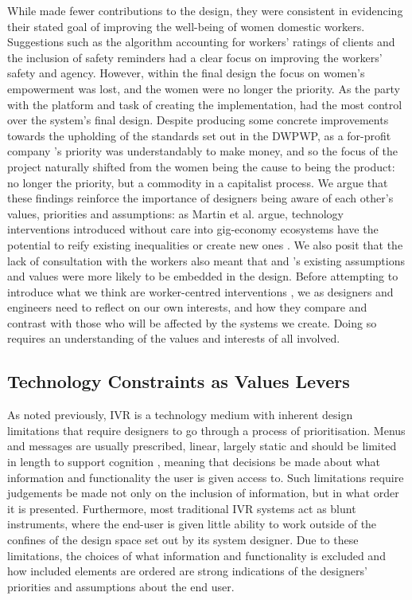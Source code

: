 While \NGO{} made fewer contributions to the design, they were consistent in evidencing their stated goal of improving the well-being of women domestic workers. Suggestions such as the algorithm accounting for workers' ratings of clients and the inclusion of safety reminders had a clear focus on improving the workers' safety and agency. However, within the final design the focus on women's empowerment was lost, and the women were no longer the priority. As the party with the platform and task of creating the implementation, \PC{} had the most control over the system's final design. Despite producing some concrete improvements towards the upholding of the standards set out in the DWPWP, as a for-profit company \PC{}'s priority was understandably to make money, and so the focus of the project naturally shifted from the women being the cause to being the product: no longer the priority, but a commodity in a capitalist process. We argue that these findings reinforce the importance of designers being aware of each other's values, priorities and assumptions: as Martin et al. argue, technology interventions introduced without care into gig-economy ecosystems have the potential to reify existing inequalities or create new ones \cite{martin2016}. We also posit that the lack of consultation with the workers also meant that \PC{} and \NGO{}'s existing assumptions and values were more likely to be embedded in the design. Before attempting to introduce what we think are worker-centred interventions \cite{carlos2021}, we as designers and engineers need to reflect on our own interests, and how they compare and contrast with those who will be affected by the systems we create. Doing so requires an understanding of the values and interests of all involved.


\subsection{Technology Constraints as Values Levers}

As noted previously, IVR is a technology medium with inherent design limitations that require designers to go through a process of prioritisation. Menus and messages are usually prescribed, linear, largely static and should be limited in length to support cognition \cite{Suhm2008}, meaning that decisions be made about what information and functionality the user is given access to. Such limitations require judgements be made not only on the inclusion of information, but in what order it is presented. Furthermore, most traditional IVR systems act as blunt instruments, where the end-user is given little ability to work outside of the confines of the design space set out by its system designer. Due to these limitations, the choices of what information and functionality is excluded and how included elements are ordered are strong indications of the designers' priorities and assumptions about the end user. 

